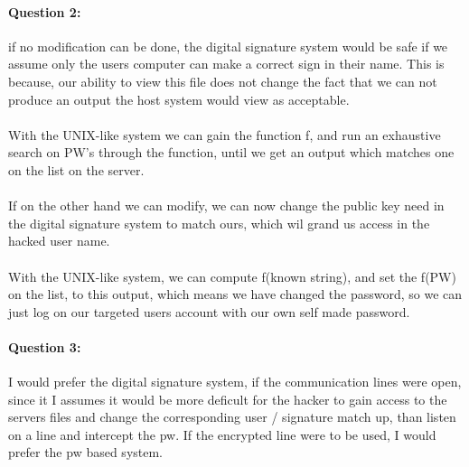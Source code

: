 \documentclass[paper=a4, fontsize=11pt]{scrartcl} %
\numberwithin{equation}{section} %
\numberwithin{figure}{section} %
\numberwithin{table}{section} %
\begin{document}
	\paragraph{Question 2:} if no modification can be done, the digital signature system would be safe if we assume only the users computer can make a correct sign in their name. This is because, our ability to view this file does not change the fact that we can not produce an output the host system would view as acceptable. \\ \\
	With the UNIX-like system we can gain the function f, and run an exhaustive search on PW's through the function, until we get an output which matches one on the list on the server. \\ \\
	If on the other hand we can modify, we can now change the public key need in the digital signature system to match ours, which wil grand us access in the hacked user name. \\ \\
	With the UNIX-like system, we can compute f(known string), and set the f(PW) on the list, to this output, which means we have changed the password, so we can just log on our targeted users account with our own self made password.
	\paragraph{Question 3:} I would prefer the digital signature system, if the communication lines were open, since it I assumes it would be more deficult for the hacker to gain access to the servers files and change the corresponding user / signature match up, than listen on a line and intercept the pw. If the encrypted line were to be used, I would prefer the pw based system.  
\end{document}
